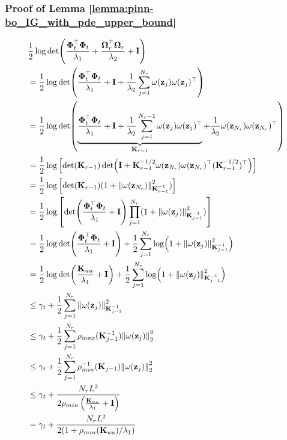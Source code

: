 \subsubsection{Proof of Lemma \ref{lemma:pinn-bo_IG_with_pde_upper_bound}}
\begin{align*}
            & \frac{1}{2}\log \det(\frac{\boldsymbol{\Phi}_t^\top \boldsymbol{\Phi}_t}{\lambda_1} + \frac{\boldsymbol{\Omega}_r^\top \boldsymbol{\Omega}_r}{\lambda_2} + \mathbf{I}) \\
            & = \frac{1}{2}\log \det(\frac{\boldsymbol{\Phi}_t^\top \boldsymbol{\Phi}_t}{\lambda_1} +  \mathbf{I} + \frac{1}{\lambda_2} \sum_{j=1}^{N_r} \omega(\mathbf{z}_j) \omega(\mathbf{z}_j)^\top) 
            \\
            & = \frac{1}{2}\log \det( \underbrace{\frac{\boldsymbol{\Phi}_t^\top \boldsymbol{\Phi}_t}{\lambda_1} +  \mathbf{I} + \frac{1}{\lambda_2} \sum_{j=1}^{N_r-1} \omega(\mathbf{z}_j) \omega(\mathbf{z}_j)^\top}_{\mathbf{K}_{r-1}} + \frac{1}{\lambda_2} \omega(\mathbf{z}_{N_r}) \omega(\mathbf{z}_{N_r})^\top) 
            \\
             & = \frac{1}{2}\log \left[ \det(\mathbf{K}_{r-1}) \det(\mathbf{I} + \mathbf{K}_{r-1}^{-1/2}\omega(\mathbf{z}_{N_r}) \omega(\mathbf{z}_{N_r})^\top(\mathbf{K}_{r-1}^{-1/2})^\top) \right]
             \\
             & = \frac{1}{2}\log \left[ \det(\mathbf{K}_{r-1}) (1+\norm{\omega(\mathbf{z}_{N_r})}^2_{\mathbf{K}^{-1}_{r-1}}) \right] 
             \\
             & = \frac{1}{2}\log \left[ \det(\frac{\boldsymbol{\Phi}_t^\top \boldsymbol{\Phi}_t}{\lambda_1} + \mathbf{I}) \prod_{j=1}^{N_r}(1+\norm{\omega(\mathbf{z}_j)}^2_{\mathbf{K}^{-1}_{j-1}}) \right] 
             \\
             & = \frac{1}{2}\log \det(\frac{\boldsymbol{\Phi}_t^\top \boldsymbol{\Phi}_t}{\lambda_1} + \mathbf{I}) + \frac{1}{2} \sum_{j=1}^{N_r} \log(1+\norm{\omega(\mathbf{z}_j)}^2_{\mathbf{K}^{-1}_{j-1}}) 
             \\
             & = \frac{1}{2}\log \det(\frac{\mathbf{K}_{uu}}{\lambda_1} + \mathbf{I}) + \frac{1}{2} \sum_{j=1}^{N_r} \log(1+\norm{\omega(\mathbf{z}_j)}^2_{\mathbf{K}^{-1}_{j-1}})
             \\
             & \le \gamma_t + \frac{1}{2} \sum_{j=1}^{N_r} \norm{\omega(\mathbf{z}_j)}^2_{\mathbf{K}^{-1}_{j-1}} 
             \\
             &  \le \gamma_t + \frac{1}{2} \sum_{j=1}^{N_r} \rho_{max}(\mathbf{K}^{-1}_{j-1}) \norm{\omega(\mathbf{z}_j)}_2^2
             \\
             & \le \gamma_t + \frac{1}{2}\sum_{j=1}^{N_r} \rho_{min}^{-1}(\mathbf{K}_{j-1}) \norm{\omega(\mathbf{z}_j)}_2^2
             \\
             & \le \gamma_t + \frac{N_r L^2}{2 \rho_{min}\left(\frac{\mathbf{K}_{uu}}{\lambda_1} + \mathbf{I}\right)} 
             \\
             &= \gamma_t + \frac{N_r L^2}{2(1+ \rho_{min}(\mathbf{K}_{uu})/\lambda_1)}
    \end{align*}
